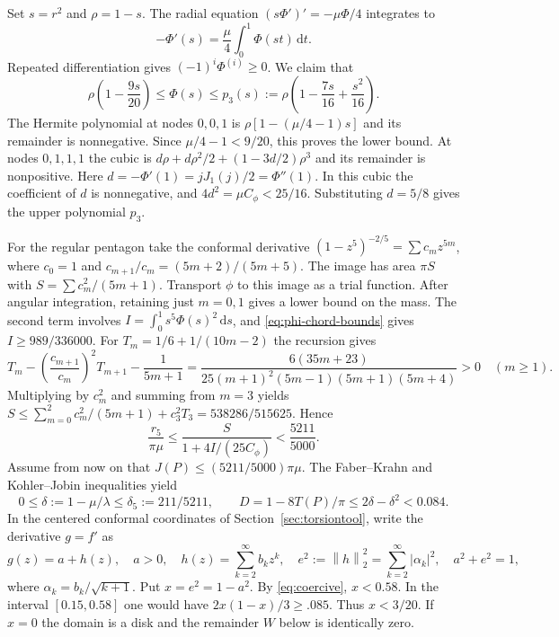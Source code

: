 \documentclass[11pt,a4paper,reqno]{amsart}
\theoremstyle{remark}
\numberwithin{equation}{section}
\newcommand{\dd}{\,\mathrm d}
\newcommand{\norm}[1]{\left\|#1\right\|_2}
\newcommand{\Cphi}{C_\phi}
\begin{document}
Set $s=r^2$ and $\rho=1-s$. The radial equation $(s\Phi')'=-\mu\Phi/4$
integrates to
\begin{equation}\label{eq:disk-average}
  -\Phi'(s)=\frac{\mu}{4}\int_0^1\Phi(st)\dd t.
\end{equation}
Repeated differentiation gives $(-1)^i\Phi^{(i)}\ge0$. We claim that
\begin{equation}\label{eq:phi-chord-bounds}
  \rho\left(1-\frac{9s}{20}\right)\le\Phi(s)\le p_3(s):=\rho\left(1-\frac{7s}{16}+\frac{s^2}{16}\right).
\end{equation}
The Hermite polynomial at nodes $0,0,1$ is $\rho[1-(\mu/4-1)s]$ and its
remainder is nonnegative. Since $\mu/4-1<9/20$, this proves the lower
bound. At nodes $0,1,1,1$ the cubic is
$d\rho+d\rho^2/2+(1-3d/2)\rho^3$ and its remainder is nonpositive.
Here $d=-\Phi'(1)=jJ_1(j)/2=\Phi''(1)$. In this cubic the coefficient of
$d$ is nonnegative, and $4d^2=\mu\Cphi<25/16$. Substituting $d=5/8$ gives
the upper polynomial $p_3$.

For the regular pentagon take the conformal derivative
$(1-z^5)^{-2/5}=\sum c_mz^{5m}$, where $c_0=1$ and
$c_{m+1}/c_m=(5m+2)/(5m+5)$. The image has area $\pi S$ with
$S=\sum c_m^2/(5m+1)$. Transport $\phi$ to this image as a trial function.
After angular integration, retaining just $m=0,1$ gives a lower bound on
the mass. The second term involves $I=\int_0^1s^5\Phi(s)^2\dd s$, and
\eqref{eq:phi-chord-bounds} gives $I\ge989/336000$. For
$T_m=1/6+1/(10m-2)$ the recursion gives
\[
 T_m-\left(\frac{c_{m+1}}{c_m}\right)^2 T_{m+1}-\frac{1}{5m+1}
 =\frac{6(35m+23)}{25(m+1)^2(5m-1)(5m+1)(5m+4)}>0\quad(m\ge1).
\]
Multiplying by $c_m^2$ and summing from $m=3$ yields
$S\le\sum_{m=0}^2c_m^2/(5m+1)+c_3^2T_3=538286/515625$. Hence
\begin{equation}\label{eq:pent}
 \frac{r_5}{\pi\mu}\le\frac{S}{1+4I/(25\Cphi)}<\frac{5211}{5000}.
\end{equation}
Assume from now on that $J(P)\le(5211/5000)\pi\mu$. The Faber--Krahn
and Kohler--Jobin inequalities yield
\[
 0\le\delta:=1-\mu/\lambda\le\delta_5:=211/5211,\qquad
 D=1-8T(P)/\pi\le2\delta-\delta^2<0.084 .
\]
In the centered conformal coordinates of Section~\ref{sec:torsiontool},
write the derivative $g=f'$ as
\begin{equation}\label{eq:conformal-norm}
  g(z)=a+h(z),\quad a>0,\quad
  h(z)=\sum_{k=2}^\infty b_k z^k,\quad
  e^2:=\norm{h}^2=\sum_{k=2}^\infty|\alpha_k|^2,\quad
  a^2+e^2=1,
\end{equation}
where $\alpha_k=b_k/\sqrt{k+1}$. Put $x=e^2=1-a^2$. By \eqref{eq:coercive},
$x<0.58$. In the interval $[0.15,0.58]$ one would have $2x(1-x)/3\ge.085$.
Thus $x<3/20$. If $x=0$ the domain is a disk and the remainder $W$ below
is identically zero.
\end{document}
